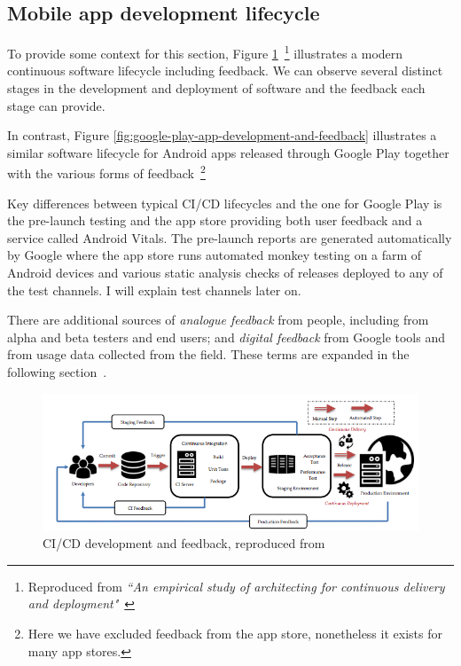 \subsection{Mobile app development lifecycle}
To provide some context for this section, Figure \ref{fig:ci-cd-development-and-feedback}~\footnote{Reproduced from \emph{``An empirical study of architecting for continuous delivery and deployment"}~\cite{shahin2019empirical_study_architecting_cd}}
illustrates a modern continuous software lifecycle including feedback. We can observe several distinct stages in the development and deployment of software and the feedback each stage can provide. %

In contrast, Figure \ref{fig:google-play-app-development-and-feedback} illustrates a similar software lifecycle for Android apps released through Google Play together with the various forms of feedback~\footnote{Here we have excluded feedback from the app store, nonetheless it exists for many app stores.} 

Key differences between typical CI/CD lifecycles and the one for Google Play is the pre-launch testing and the app store providing both user feedback and a service called Android Vitals. The pre-launch reports are generated automatically by Google where the app store runs automated monkey testing on a farm of Android devices and various static analysis checks of releases deployed to any of the test channels. I will explain test channels later on. %

There are additional sources of \emph{analogue feedback} from people, including from alpha and beta testers and end users; and \emph{digital feedback} from Google tools and from usage data collected from the field. These terms are expanded in the following section~\href{analogue-and-digital-feedback}{\emph{}}.


\begin{figure}[ht]
    \centering
    \includegraphics[width=13cm]{images/ci-cd-development-and-feedback.png}
    \caption{CI/CD development and feedback, reproduced from~\cite{shahin2019empirical_study_architecting_cd}}
    \label{fig:ci-cd-development-and-feedback}
\end{figure}

